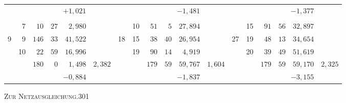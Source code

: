 \begin{center}
\begin{tabular}{|r|r|r@{\;}r@{\;}r|r||r|r|r@{\;}r@{\;}r|r||r|r|r@{\;}r@{\;}r|r|}
 &  & \multicolumn{3}{r|}{$+1{,}021$} &  &  &  & \multicolumn{3}{r|}{$-1{,}481$} &  &  &  & \multicolumn{3}{r|}{$-1{,}377$} & \\
 &  &  &  &  &  &  &  &  &  &  &  &  &  &  &  &  & \\
 & 7 & $10$ & $27$ & $2{,}980$ &  &  & 10 & $51$ & $5$ & $27{,}894$ &  &  & 15 & $91$ & $56$ & $32{,}897$ & \\
9 & 9 & $146$ & $33$ & $41{,}522$ &  & 18 & 15 & $38$ & $40$ & $26{,}954$ &  & 27 & 19 & $48$ & $13$ & $34{,}654$ & \\
 & 10 & $22$ & $59$ & $16{,}996$ &  &  & 19 & $90$ & $14$ & $4{,}919$ &  &  & 20 & $39$ & $49$ & $51{,}619$ & \\
\cline{3-5}\cline{9-11}\cline{15-17}
 &  & $180$ & $0$ & $1{,}498$ & $2{,}382$ &  &  & $179$ & $59$ & $59{,}767$ & $1{,}604$ &  &  & $179$ & $59$ & $59{,}170$ & $2{,}325$\\
 &  & \multicolumn{3}{r|}{$-0{,}884$} &  &  &  & \multicolumn{3}{r|}{$-1{,}837$} &  &  &  & \multicolumn{3}{r|}{$-3{,}155$} & \\
\end{tabular}
\endgroup
\end{center}
\noindent\hspace*{10cm}\raisebox{.4ex}{\scriptsize--}
\clearpage
\noindent\mbox{}\hfill\textsc{Zur Netzausgleichung.}\hfill301\par\medskip
